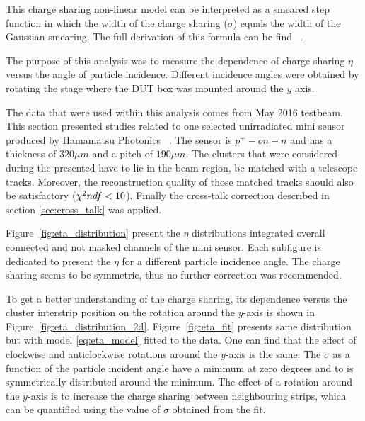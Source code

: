 This charge sharing non-linear model can be interpreted as a smeared step function in which the width of the charge sharing ($ \sigma $) equals the width of the Gaussian smearing.   The full derivation of this formula can be find ~\cite{eta_note}. 

The purpose of this analysis was to measure the dependence of charge sharing $ \eta $ versus the angle of particle incidence.  Different incidence angles were obtained by rotating the stage where the DUT box was mounted around the $y$ axis. 

The data that were used within this analysis comes from May 2016 testbeam.  This section presented studies related to one selected unirradiated mini sensor produced by Hamamatsu Photonics ~\cite{Hamamatsu}. The sensor is $p^{+}-on-n$ and has a thickness of $320 \mu m$ and a pitch of $190 \mu m$. The clusters that were considered during the presented have to lie in the beam region, be matched with a telescope tracks.  Moreover, the reconstruction quality of those matched tracks should also be satisfactory ($\chi^{2}\/ndf<10$).
Finally the cross-talk correction described in section \ref{sec:cross_talk} was applied.

Figure~\ref{fig:eta_distribution} present the $\eta$ distributions integrated overall connected and not masked channels of the mini sensor. Each subfigure is dedicated to present the  $\eta$ for a different particle incidence angle. 
The charge sharing seems to be symmetric, thus no further correction was recommended. 

To get a better understanding of the charge sharing, its dependence versus the cluster interstrip position on the rotation around the $y$-axis is shown in Figure~\ref{fig:eta_distribution_2d}. Figure~\ref{fig:eta_fit} presents same distribution but with model \ref{eq:eta_model} fitted to the data. One can find that the effect of clockwise and anticlockwise rotations around the $y$-axis is the same.  The $\sigma$ as a function
of the particle incident angle have a minimum at zero degrees and to is symmetrically distributed around the minimum. The effect of a rotation around the $y$-axis is to increase the charge sharing between neighbouring strips, which can be quantified using the value of $\sigma$ obtained from the fit. 


